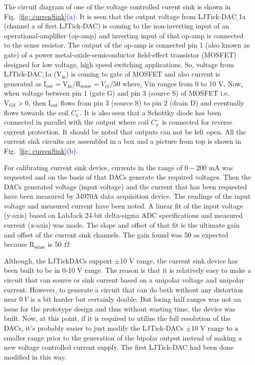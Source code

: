 

The circuit diagram of one of the voltage controlled curent sink is shown in Fig.~\ref{fig: currenSink}\textcolor{blue}{(a)}. It is seen that the output voltage from LJTick-DAC$\_$1a (channel a of first LJTick-DAC) is coming to the non-inverting input of an operational-amplifier (op-amp) and inverting input of that op-amp is connected to the sense resistor. The output of the op-amp is connected pin 1 (also known as gate) of a power metal-oxide-semiconductor field-effect transistor (MOSFET) designed for low voltage, high
speed switching applications. So, voltage from LJTick-DAC$\_$1a ($\mathrm{V_{in}}$) is coming to gate of MOSFET and also current is generated as $\mathrm{I_{out}=V_{in}/R_{sense}}=V_{in}/50$ where, $\mathrm{Vin}$ ranges from 0 to 10 V. Now, when voltage between pin 1 (gate G) and pin 3 (source S) of MOSFET i.e.  $\mathrm{V_{GS}>0}$, then $\mathrm{I_{out}}$ flows from pin 3 (source S) to pin 2 (drain D) and eventually flows towards the coil $C_x^-$. It is also seen that a Schottky diode has been connected in parallel with the output where coil $C_x^-$ is connected for reverse current protection. It should be noted that outputs can not be left open. All the current sink circuits are assembled in a box and a picture from top is shown in Fig.~\ref{fig: currenSink}\textcolor{blue}{(b)}.

For calibrating current sink device, currents in the range of $0-200$ mA was requested and on the basis of that DACs generate the required voltages. Then the DACs generated voltage (input voltage) and the current that has been requested have been measured by 34970A data acquisition device. The readings of the input voltage and measured current have been noted. A linear fit of the input voltage (y-axis) based on LabJack 24-bit delta-sigma ADC specifications and measured current (x-axis) was made. The slope and offset of that fit is the ultimate gain and offset of the current sink channels. The gain found was 50 as expected because $\mathrm{R_{sense}}$ is 50 $\Omega$.  

Although, the LJTickDACs support $\pm$10 V range, the current sink device has been built to be in 0-10 V range. The reason is that it is relatively easy to make a circuit that can source or sink current based on a unipolar voltage and unipolar current. However, to generate a circuit that can do both without any distortion near $0\:V$ is a bit harder but certainly doable. But losing half ranges was not an issue for the prototype design and thus without wasting time, the device was built. Now, at this point, if it is required to utilize the full resolution of the DACs,  it$'$s probably easier to just modify the LJTick-DACs $\pm$10 V range to a smaller range prior to the generation of the bipolar output instead of making a new voltage controlled current supply. The first LJTick-DAC had been done modified in this way. 

